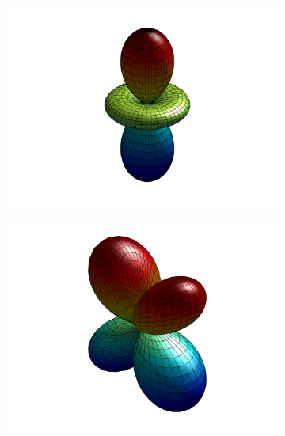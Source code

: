 \begin{figure}
\label{fig::Sn_Y2}
\centering
	\begin{subfigure}[b]{0.45\textwidth}
		\centering
		\includegraphics[width=\textwidth]{figures/appendices/Y_2_0.png}
		\caption{}
	\end{subfigure}
	\vfill
	\begin{subfigure}[b]{0.40\textwidth}
		\centering
		\includegraphics[width=\textwidth]{figures/appendices/Y_2_-1.png}
		\caption{}
	\end{subfigure}
	\hfill
	\begin{subfigure}[b]{0.40\textwidth}
		\centering

\end{subfigure}
\end{figure}
